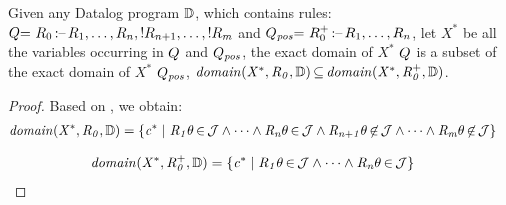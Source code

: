 \documentclass[acmsmall,screen,review,anonymous,nonacm]{acmart}
\begin{document}
\begin{lemma} \label{lemma:negation_over_approx}
Given any Datalog program $\mathbb{D}$, which contains rules:  
$\drule{=}\ \relation_0{\datalogarrow}\relation_1,\dots,\relation_n, 
!\relation_{n+1}, \dots, !\relation_m$ and 
$\drule_{\m{pos}}{=}\ \relation_0^+{\datalogarrow}\relation_1,\dots,\relation_n$, 
let $X^*$ be all the variables occurring in $Q$ and $Q_{\mathit{pos}}$, 
the exact domain of $X^*$ \wrt $Q$ is a subset of the exact domain of $X^*$ \wrt $Q_{\mathit{pos}}$, \ie  
$\mathit{domain}\mathit{(X^*, R_0, \mathbb{D})} {\,\subseteq\,} \mathit{domain}\mathit{(X^*, R_0^+, \mathbb{D})}$.
{
\small
\begin{proof}
Based on , we obtain: 
\\[-1em]
\begin{align*}
\mathit{domain}\mathit{(X^*, R_0, \mathbb{D})} =
\mathit{
\{c^* \mid~ 
}
&\mathit{ 
R_1\theta{\,\in\,}\mathcal{J} \wedge \dots \wedge 
R_n\theta{\,\in\,}\mathcal{J} \wedge R_{n{+}1}\theta{\,\not\in\,}\mathcal{J} 
\wedge \dots \wedge 
R_m\theta{\,\not\in\,}\mathcal{J}
\}
}
\end{align*}
\vspace{-8mm}

\begin{align*}
\mathit{domain}\mathit{(X^*, R_0^+, \mathbb{D})} &=
\mathit{
\{c^* \mid 
R_1\theta{\,\in\,}\mathcal{J} \wedge \dots \wedge 
R_n\theta{\,\in\,}\mathcal{J} 
\}
}
\end{align*}


\end{proof}}
\end{lemma}
\end{document}
